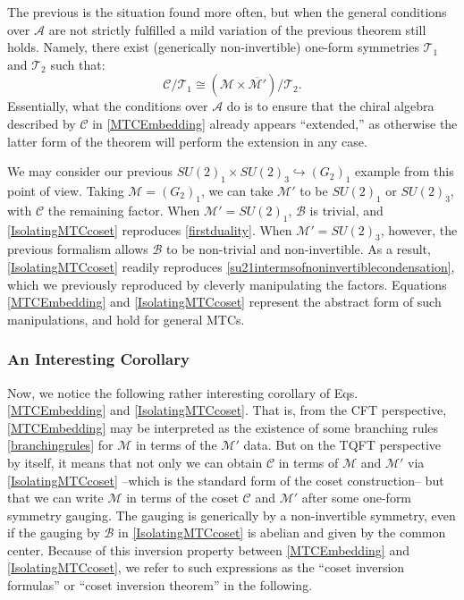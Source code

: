 \documentclass[11pt]{article}
\numberwithin{equation}{section}
\begin{document}
The previous is the situation found more often, but when the general conditions over $\mathcal{A}$ are not strictly fulfilled a mild variation of the previous theorem still holds. Namely, there exist (generically non-invertible) one-form symmetries $\mathcal{T}_{1}$ and $\mathcal{T}_{2}$ such that:
\begin{equation} 
    \mathcal{C}/\mathcal{T}_{1} \cong (\mathcal{M} \times \overline{\mathcal{M}'})/\mathcal{T}_{2}.
\end{equation}
Essentially, what the conditions over $\mathcal{A}$ do is to ensure that the chiral algebra described by $\mathcal{C}$ in \eqref{MTCEmbedding} already appears ``extended,'' as otherwise the latter form of the theorem will perform the extension in any case.

We may consider our previous $SU(2)_{1} \times SU(2)_{3} \hookrightarrow (G_{2})_{1}$ example from this point of view. Taking $\mathcal{M} = (G_{2})_{1}$, we can take $\mathcal{M}'$ to be $SU(2)_{1}$ or $SU(2)_{3}$, with $\mathcal{C}$ the remaining factor. When $\mathcal{M}' = SU(2)_{1}$, $\mathcal{B}$ is trivial, and \eqref{IsolatingMTCcoset} reproduces \eqref{firstduality}. When $\mathcal{M}' = SU(2)_{3}$, however, the previous formalism allows $\mathcal{B}$ to be non-trivial and non-invertible. As a result, \eqref{IsolatingMTCcoset} readily reproduces \eqref{su21intermsofnoninvertiblecondensation}, which we previously reproduced by cleverly manipulating the factors. Equations \eqref{MTCEmbedding} and \eqref{IsolatingMTCcoset} represent the abstract form of such manipulations, and hold for general MTCs.



\subsubsection*{An Interesting Corollary}


Now, we notice the following rather interesting corollary of Eqs. \eqref{MTCEmbedding} and \eqref{IsolatingMTCcoset}. That is, from the CFT perspective, \eqref{MTCEmbedding} may be interpreted as the existence of some branching rules \eqref{branchingrules} for $\mathcal{M}$ in terms of the $\mathcal{M}'$ data. But on the TQFT perspective by itself, it means that not only we can obtain $\mathcal{C}$ in terms of $\mathcal{M}$ and $\mathcal{M}'$ via \eqref{IsolatingMTCcoset} --which is the standard form of the coset construction-- but that we can write $\mathcal{M}$ in terms of the coset $\mathcal{C}$ and $\mathcal{M}'$ after some one-form symmetry gauging. The gauging is generically by a non-invertible symmetry, even if the gauging by $\mathcal{B}$ in \eqref{IsolatingMTCcoset} is abelian and given by the common center. Because of this inversion property between \eqref{MTCEmbedding} and \eqref{IsolatingMTCcoset}, we refer to such expressions as the ``coset inversion formulas'' or ``coset inversion theorem'' in the following.
\end{document}
